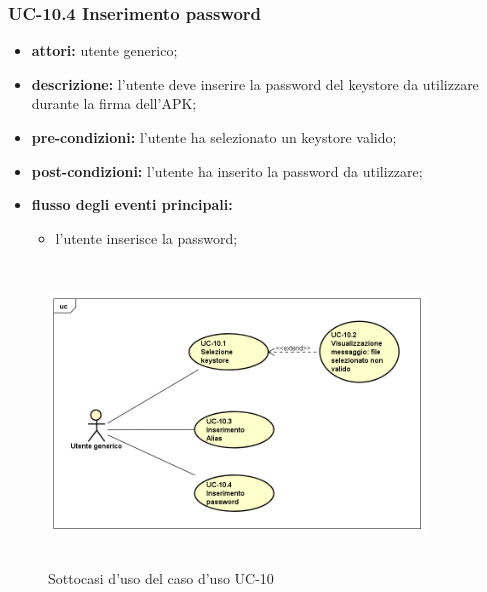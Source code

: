 \subsubsection*{UC-10.4 Inserimento password}
\begin{itemize}
    \item \textbf{attori:} utente generico;
    \item \textbf{descrizione:} l'utente deve inserire la password del keystore da utilizzare durante la firma dell'APK;
    \item \textbf{pre-condizioni:} l'utente ha selezionato un keystore valido;
    \item \textbf{post-condizioni:} l'utente ha inserito la password da utilizzare;
    \item \textbf{flusso degli eventi principali:}
    \begin{itemize}
        \item l'utente inserisce la password;
    \end{itemize}
\end{itemize}
\begin{figure}[H]
    \centering
    \includegraphics[width=10cm, height=8cm]{./immagini/usecase/uc_10.png}
    \caption{Sottocasi d'uso del caso d'uso UC-10}
\end{figure}

